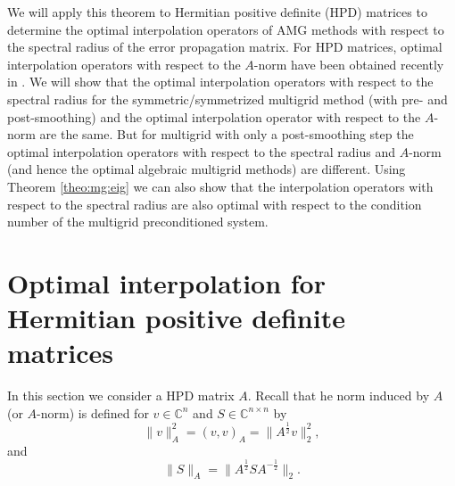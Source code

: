 \documentclass[final]{siamltex}
\newcommand{\uha}{^{\frac{1}{2}}}
\newcommand{\umha}{^{-\frac{1}{2}}}
\numberwithin{equation}{section}
\newcommand{\bCn}{\mathbb{C}^n}
\newcommand{\Cnn}{\mathbb{C}^{n \times n}}
\begin{document}
We will apply this theorem to Hermitian positive definite (HPD)  matrices to
determine
the
optimal interpolation operators of AMG methods with respect to
the
spectral radius of the error propagation matrix.
For HPD 
matrices, optimal interpolation  operators with respect to the
$A$-norm have been obtained recently in \cite{XuZ17, Bra18}.
We will show that the optimal interpolation operators with respect to the
spectral
radius
for
the
symmetric/symmetrized
multigrid
method
(with
pre-
and
post-smoothing) and
the
optimal
interpolation operator with respect to the $A$-norm are the same. But for
multigrid
with
only
a
post-smoothing step
the optimal interpolation operators with respect to the spectral radius and
$A$-norm
(and
hence
the
optimal
algebraic
multigrid
methods)
are  different. Using Theorem \ref{theo:mg:eig} we can also show that the 
interpolation operators with respect to the spectral radius are also optimal 
with
respect to the condition number of the multigrid preconditioned system. 

\section{Optimal interpolation  for Hermitian positive definite matrices}

In this section  we  consider a HPD matrix $A$. Recall that he norm induced by
$A$ (or $A$-norm) is defined for $v \in \bCn$ and $S
\in \Cnn$ by
\[
\| v \|_A^2 = (v,v)_A = \|A\uha v\|_2^2,
\]
and 
\[
\| S \|_A = \|A\uha S A\umha\|_2.
\]
\end{document}
